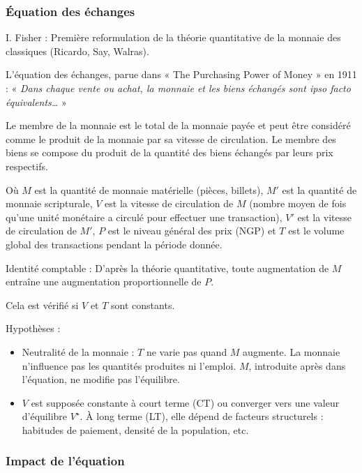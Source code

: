 \documentclass[a4paper, 12pt]{report}
\begin{document}
\subsubsection{Équation des échanges}
	
I. Fisher : Première reformulation de la théorie quantitative de la monnaie des classiques (Ricardo, Say, Walras).  

L'équation des échanges, parue dans « The Purchasing Power of Money » en 1911 :  
« \textit{Dans chaque vente ou achat, la monnaie et les biens échangés sont ipso facto équivalents… }»  
\begin{center}
	Le membre de la monnaie est le total de la monnaie payée et peut être considéré comme le produit de la monnaie par sa vitesse de circulation. Le membre des biens se compose du produit de la quantité des biens échangés par leurs prix respectifs.
\end{center}  

Où \( M \) est la quantité de monnaie matérielle (pièces, billets), \( M' \) est la quantité de monnaie scripturale, \( V \) est la vitesse de circulation de \( M \) (nombre moyen de fois qu'une unité monétaire a circulé pour effectuer une transaction), \( V' \) est la vitesse de circulation de \( M' \), \( P \) est le niveau général des prix (NGP) et \( T \) est le volume global des transactions pendant la période donnée.  

Identité comptable : D'après la théorie quantitative, toute augmentation de \( M \) entraîne une augmentation proportionnelle de \( P \).  

Cela est vérifié si \( V \) et \( T \) sont constants.  

Hypothèses :  
\begin{itemize}
	\item Neutralité de la monnaie : \( T \) ne varie pas quand \( M \) augmente. La monnaie n'influence pas les quantités produites ni l'emploi. \( M \), introduite après dans l'équation, ne modifie pas l'équilibre.
	\item \( V \) est supposée constante à court terme (CT) ou converger vers une valeur d'équilibre \( V^\star \). À long terme (LT), elle dépend de facteurs structurels : habitudes de paiement, densité de la population, etc.
\end{itemize}
	
\subsubsection{Impact de l'équation}
\end{document}
